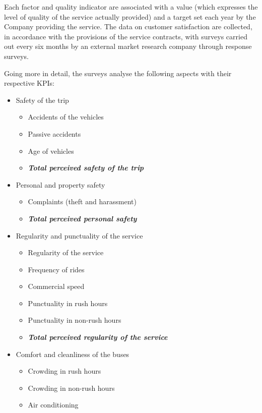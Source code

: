 Each factor and quality indicator are associated with a value (which expresses the level of quality of the service actually provided) and a target set each year by the Company providing the service.
The data on customer satisfaction are collected, in accordance with the provisions of the service contracts, with surveys carried out every six months by an external market research company through response surveys. 

Going more in detail, the surveys analyse the following aspects with their respective KPIs:

\begin{itemize}
    \item {Safety of the trip}
\begin{itemize}
    \item Accidents of the vehicles
    \item Passive accidents
    \item Age of vehicles
    \item \textit{\textbf{Total perceived safety of the trip}}
\end{itemize}
    \item Personal and property safety
    \begin{itemize}
        \item	Complaints (theft and harassment)
        \item \textit{\textbf{Total perceived personal safety}}
    \end{itemize}
    \item Regularity and punctuality of the service
    \begin{itemize}
        \item Regularity of the service
        \item Frequency of rides
        \item Commercial speed
        \item Punctuality in rush hours
        \item Punctuality in non-rush hours
        \item \textit{\textbf{Total perceived regularity of the service}}
    \end{itemize}
    \item	Comfort and cleanliness of the buses
    \begin{itemize}
        \item Crowding in rush hours 
        \item Crowding in non-rush hours 
        \item Air conditioning

\end{itemize}
\end{itemize}
